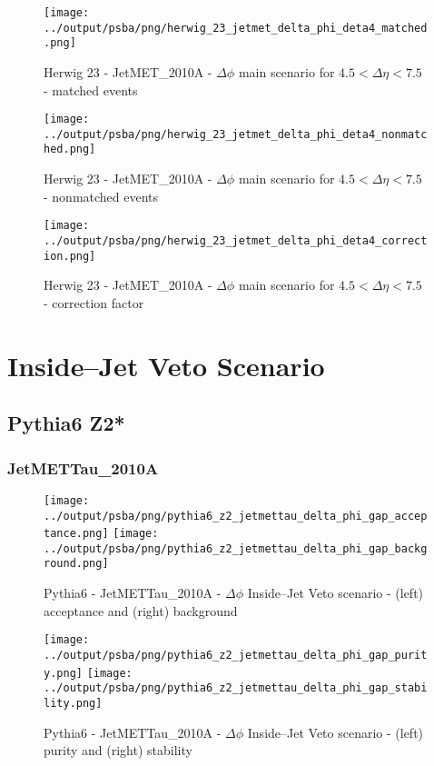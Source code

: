 \documentclass[11pt]{book}
\begin{document}
\begin{figure}[ht]
\centering
\texttt{[image: ../output/psba/png/herwig\_23\_jetmet\_delta\_phi\_deta4\_matched.png]}
\caption{Herwig 23 - JetMET\_2010A - $\Delta\phi$ main scenario for $4.5 < \Delta\eta < 7.5$ - matched events}
\label{fig:hw_23_jetmet_delta_phi_deta4_matched}
\end{figure}

\begin{figure}[ht]
\centering
\texttt{[image: ../output/psba/png/herwig\_23\_jetmet\_delta\_phi\_deta4\_nonmatched.png]}
\caption{Herwig 23 - JetMET\_2010A - $\Delta\phi$ main scenario for $4.5 < \Delta\eta < 7.5$ - nonmatched events}
\label{fig:hw_23_jetmet_delta_phi_deta4_nonmatched}
\end{figure}

\begin{figure}[ht]
\centering
\texttt{[image: ../output/psba/png/herwig\_23\_jetmet\_delta\_phi\_deta4\_correction.png]}
\caption{Herwig 23 - JetMET\_2010A - $\Delta\phi$ main scenario for $4.5 < \Delta\eta < 7.5$ - correction factor}
\label{fig:hw_23_jetmet_delta_phi_deta4_correction}
\end{figure}




\clearpage
\chapter{Inside--Jet Veto Scenario}
\section{Pythia6 Z2*}
\subsection{JetMETTau\_2010A}

\begin{figure}[ht]
\centering
\texttt{[image: ../output/psba/png/pythia6\_z2\_jetmettau\_delta\_phi\_gap\_acceptance.png]}
\texttt{[image: ../output/psba/png/pythia6\_z2\_jetmettau\_delta\_phi\_gap\_background.png]}
\caption{Pythia6 - JetMETTau\_2010A - $\Delta\phi$ Inside--Jet Veto scenario - (left) acceptance and (right) background}
\label{fig:p6_jetmettau_delta_phi_gap_ab}
\end{figure}

\begin{figure}[ht]
\centering
\texttt{[image: ../output/psba/png/pythia6\_z2\_jetmettau\_delta\_phi\_gap\_purity.png]}
\texttt{[image: ../output/psba/png/pythia6\_z2\_jetmettau\_delta\_phi\_gap\_stability.png]}
\caption{Pythia6 - JetMETTau\_2010A - $\Delta\phi$ Inside--Jet Veto scenario - (left) purity and (right) stability}
\label{fig:p6_jetmettau_delta_phi_gap_ps}
\end{figure}
\end{document}
